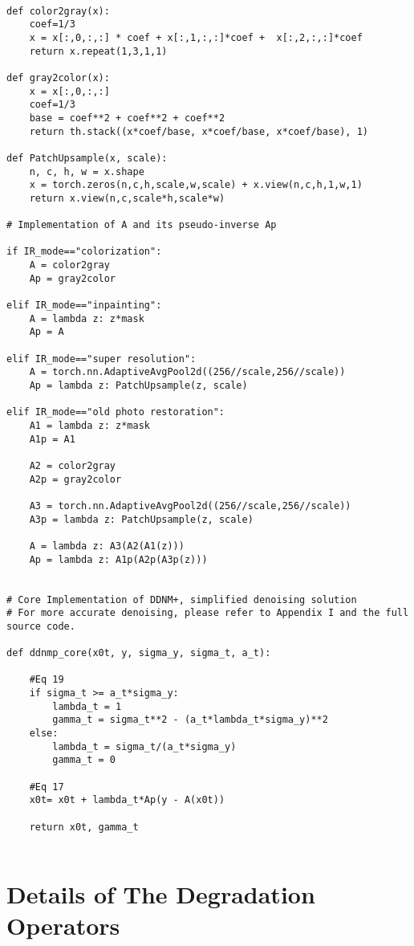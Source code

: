 \documentclass{article} \usepackage{iclr2023_conference,times}
\begin{document}
\begin{lstlisting}

def color2gray(x):
    coef=1/3
    x = x[:,0,:,:] * coef + x[:,1,:,:]*coef +  x[:,2,:,:]*coef
    return x.repeat(1,3,1,1)

def gray2color(x):
    x = x[:,0,:,:]
    coef=1/3
    base = coef**2 + coef**2 + coef**2
    return th.stack((x*coef/base, x*coef/base, x*coef/base), 1)      
    
def PatchUpsample(x, scale):
    n, c, h, w = x.shape
    x = torch.zeros(n,c,h,scale,w,scale) + x.view(n,c,h,1,w,1)
    return x.view(n,c,scale*h,scale*w)

# Implementation of A and its pseudo-inverse Ap    
    
if IR_mode=="colorization":
    A = color2gray
    Ap = gray2color
    
elif IR_mode=="inpainting":
    A = lambda z: z*mask
    Ap = A
      
elif IR_mode=="super resolution":
    A = torch.nn.AdaptiveAvgPool2d((256//scale,256//scale))
    Ap = lambda z: PatchUpsample(z, scale)

elif IR_mode=="old photo restoration":
    A1 = lambda z: z*mask
    A1p = A1
    
    A2 = color2gray
    A2p = gray2color
    
    A3 = torch.nn.AdaptiveAvgPool2d((256//scale,256//scale))
    A3p = lambda z: PatchUpsample(z, scale)
    
    A = lambda z: A3(A2(A1(z)))
    Ap = lambda z: A1p(A2p(A3p(z)))
    

# Core Implementation of DDNM+, simplified denoising solution
# For more accurate denoising, please refer to Appendix I and the full source code.

def ddnmp_core(x0t, y, sigma_y, sigma_t, a_t):

    #Eq 19
    if sigma_t >= a_t*sigma_y: 
        lambda_t = 1
        gamma_t = sigma_t**2 - (a_t*lambda_t*sigma_y)**2
    else:
        lambda_t = sigma_t/(a_t*sigma_y)
        gamma_t = 0
        
    #Eq 17    
    x0t= x0t + lambda_t*Ap(y - A(x0t))
    
    return x0t, gamma_t
    
\end{lstlisting}



\newpage

\section{Details of The Degradation Operators}
\end{document}
